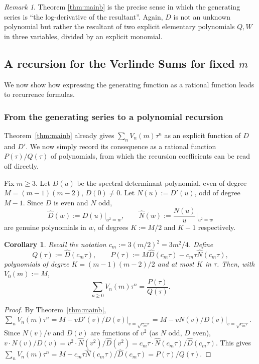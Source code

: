 \documentclass[11pt,reqno]{amsart}
\newtheorem{corollary}[theorem]{Corollary}
\theoremstyle{remark}
\newtheorem{remark}[theorem]{Remark}
\begin{document}
\begin{remark}
Theorem \ref{thm:mainb} is the precise sense in which the
generating series is ``the log-derivative of the resultant''.  Again,
$D$ is not an unknown polynomial but rather the resultant of two
explicit elementary polynomials $Q,W$ in three variables, divided by
an explicit monomial.
\end{remark}

\subsection{A recursion for the Verlinde Sums for fixed \texorpdfstring{$m$}{m}}
\label{sec:recursion}

We now show how expressing the generating function as a rational function leads
to recurrence formulas.

\subsubsection{From the generating series to a polynomial recursion}

Theorem~\ref{thm:mainb} already gives $\sum_nV_n(m)\tau^n$
as an explicit function of $D$ and $D'$.  We now simply record its
consequence as a rational function $P(\tau)/Q(\tau)$ of
polynomials, from which the recursion coefficients can be read off
directly.

Fix $m\ge3$. Let $D(u)$ be the spectral determinant polynomial, even of degree
$M=(m-1)(m-2)$, $D(0)\ne0$.  Let $N(u):=D'(u)$, odd of degree $M-1$.
Since $D$ is even and $N$ odd,
\[
\widehat D(w) := D(u)\big|_{u^2=w}, \qquad \widehat N(w) := \frac{N(u)}{u}\bigg|_{u^2=w}
\]
are genuine polynomials in $w$, of degrees $K:=M/2$ and $K-1$
respectively.

\begin{corollary}
\label{cor:polynomial-form}
Recall the notation $c_m:=3(m/2)^2=3m^2/4$. Define
\[
Q(\tau) := \widehat D(c_m\tau), \qquad P(\tau) := M\widehat D(c_m\tau) - c_m\tau\widehat N(c_m\tau),
\]
polynomials of degree $K=(m-1)(m-2)/2$ and at most $K$ in $\tau$. Then, with $V_0(m):=M$,
\[
\sum_{n\ge0} V_n(m)\tau^n = \frac{P(\tau)}{Q(\tau)}.
\]
\end{corollary}

\begin{proof}
By Theorem~\ref{thm:mainb},
$\sum_nV_n(m)\tau^n = M - vD'(v)/D(v)\big|_{v=\sqrt{c_m\tau}} = M - vN(v)/D(v)\big|_{v=\sqrt{c_m\tau}}$.
Since $N(v)/v$ and $D(v)$ are functions of $v^2$ (as $N$
odd, $D$ even),
$v\cdot N(v)/D(v) = v^2\cdot\widehat N(v^2)/\widehat D(v^2) = c_m\tau\cdot\widehat N(c_m\tau)/\widehat D(c_m\tau) $. This gives
$\sum_nV_n(m)\tau^n = M-c_m\tau\widehat N(c_m\tau)/\widehat D(c_m\tau) = P(\tau)/Q(\tau)$.
\end{proof}
\end{document}
